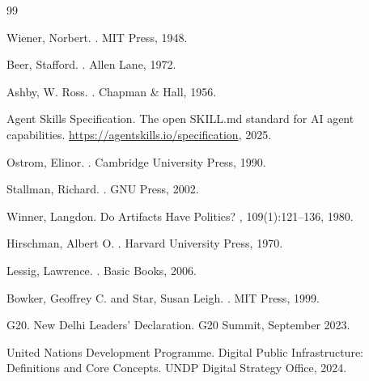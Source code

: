 \documentclass{article}
\begin{document}

\begin{thebibliography}{99}

Wiener, Norbert.
.
\newblock MIT Press, 1948.

Beer, Stafford.
.
\newblock Allen Lane, 1972.

Ashby, W. Ross.
.
\newblock Chapman \& Hall, 1956.

Agent Skills Specification.
\newblock The open SKILL.md standard for AI agent capabilities.
\newblock \url{https://agentskills.io/specification}, 2025.

Ostrom, Elinor.
.
\newblock Cambridge University Press, 1990.

Stallman, Richard.
.
\newblock GNU Press, 2002.

Winner, Langdon.
\newblock Do Artifacts Have Politics?
, 109(1):121--136, 1980.

Hirschman, Albert O.
.
\newblock Harvard University Press, 1970.

Lessig, Lawrence.
.
\newblock Basic Books, 2006.

Bowker, Geoffrey C. and Star, Susan Leigh.
.
\newblock MIT Press, 1999.

G20.
\newblock New Delhi Leaders' Declaration.
\newblock G20 Summit, September 2023.

United Nations Development Programme.
\newblock Digital Public Infrastructure: Definitions and Core Concepts.
\newblock UNDP Digital Strategy Office, 2024.


\end{thebibliography}
\end{document}
